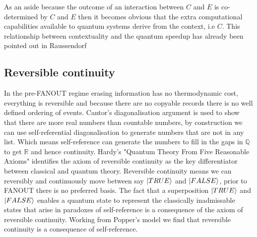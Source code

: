 \documentclass{article}
\begin{document}
As an aside because the outcome of an interaction between $C$ and $E$ is co-determined by $C$ and $E$ then it becomes obvious that the extra computational capabilities available to quantum systems derive from the context, i.e $C$. This relationship between contextuality and the quantum speedup has already been pointed out in Raussendorf \autocite{Raussendorf2009ContextualityComputation}

\subsection{Reversible continuity}
In the pre-FANOUT regime erasing information has no thermodynamic cost, everything is reversible and because there are no copyable records there is no well defined ordering of events. Cantor's diagonalisation argument is used to show that there are more real numbers than countable numbers, by construction we can use self-referential diagonalisation to generate numbers that are not in any list. Which means self-reference can generate the numbers to fill in the gaps in $\mathbb{Q}$ to get $\mathbb{R}$ and hence continuity. Hardy's "Quantum Theory From Five Reasonable Axioms" \autocite{Hardy2001a} identifies the axiom of reversible continuity as the key differentiator between classical and quantum theory. Reversible continuity means we can reversibly and continuously move between say $\ket{TRUE}$ and $\ket{FALSE}$, prior to FANOUT there is no preferred basis. The fact that a superposition $\ket{TRUE}$ and $\ket{FALSE}$ enables a quantum state to represent the classically inadmissable states that arise in paradoxes of self-reference is a consequence of the axiom of reversible continuity. Working from Popper's model we find that reversible continuity is a consequence of self-reference. 
\end{document}
